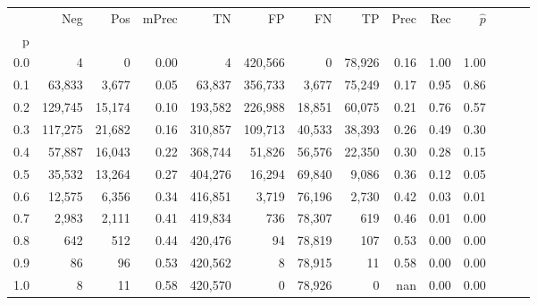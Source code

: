 \begin{tabular}{rrrrrrrrrrrrrr}
\toprule
{} &      Neg &     Pos & mPrec &       TN &       FP &      FN &      TP &  Prec &   Rec & $\hat{p}$ \\
p   &          &         &       &          &          &         &         &       &       &           \\
\midrule
0.0 &        4 &       0 &  0.00 &        4 &  420,566 &       0 &  78,926 &  0.16 &  1.00 &      1.00 \\
0.1 &   63,833 &   3,677 &  0.05 &   63,837 &  356,733 &   3,677 &  75,249 &  0.17 &  0.95 &      0.86 \\
0.2 &  129,745 &  15,174 &  0.10 &  193,582 &  226,988 &  18,851 &  60,075 &  0.21 &  0.76 &      0.57 \\
0.3 &  117,275 &  21,682 &  0.16 &  310,857 &  109,713 &  40,533 &  38,393 &  0.26 &  0.49 &      0.30 \\
0.4 &   57,887 &  16,043 &  0.22 &  368,744 &   51,826 &  56,576 &  22,350 &  0.30 &  0.28 &      0.15 \\
0.5 &   35,532 &  13,264 &  0.27 &  404,276 &   16,294 &  69,840 &   9,086 &  0.36 &  0.12 &      0.05 \\
0.6 &   12,575 &   6,356 &  0.34 &  416,851 &    3,719 &  76,196 &   2,730 &  0.42 &  0.03 &      0.01 \\
0.7 &    2,983 &   2,111 &  0.41 &  419,834 &      736 &  78,307 &     619 &  0.46 &  0.01 &      0.00 \\
0.8 &      642 &     512 &  0.44 &  420,476 &       94 &  78,819 &     107 &  0.53 &  0.00 &      0.00 \\
0.9 &       86 &      96 &  0.53 &  420,562 &        8 &  78,915 &      11 &  0.58 &  0.00 &      0.00 \\
1.0 &        8 &      11 &  0.58 &  420,570 &        0 &  78,926 &       0 &   nan &  0.00 &      0.00 \\
\bottomrule
\end{tabular}

